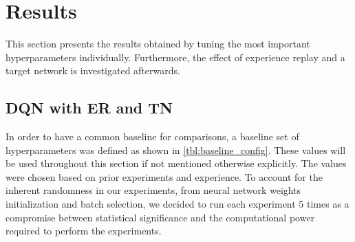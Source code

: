 \documentclass{article}
\begin{document}
\section{Results}
\label{sec:results}
This section presents the results obtained by tuning the most important hyperparameters individually. 
Furthermore, the effect of experience replay and a target network is investigated afterwards.

\subsection{DQN with ER and TN}
\label{subsec:dqn-with-er-and-tn}

In order to have a common baseline for comparisons, a baseline set of hyperparameters was defined as shown in \autoref{tbl:baseline_config}. 
These values will be used throughout this section if not mentioned otherwise explicitly.
The values were chosen based on prior experiments and experience.
To account for the inherent randomness in our experiments,
from neural network weights initialization and batch selection, 
we decided to run each experiment 5 times as a compromise between 
statistical significance and the computational power required to perform the experiments.
\end{document}
